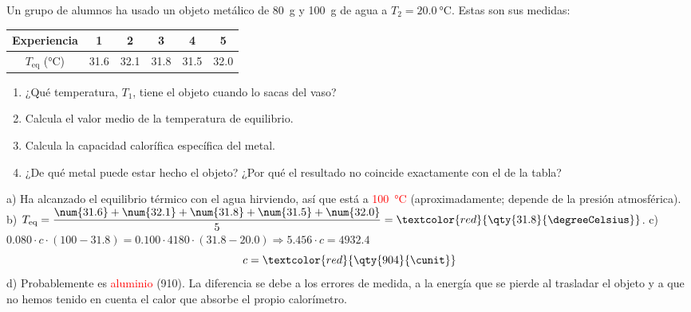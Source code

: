 \begin{exercise}
    Un grupo de alumnos ha usado un objeto metálico de \qty{80}{\gram} y \qty{100}{\gram} de agua a \(T_2 = \qty{20.0}{\degreeCelsius}\). Estas son sus medidas:
    \begin{center}
        \begin{tabular}{@{}cccccc@{}}
            \toprule
            \textbf{Experiencia} & \textbf{1} & \textbf{2} & \textbf{3} & \textbf{4} & \textbf{5} \\
            \midrule
            \(T_{\text{eq}}\) (\unit{\degreeCelsius}) & \num{31.6} & \num{32.1} & \num{31.8} & \num{31.5} & \num{32.0} \\
            \bottomrule
        \end{tabular}
    \end{center}
    \begin{enumerate}[label=\alph*)]
        \item ¿Qué temperatura, \(T_1\), tiene el objeto cuando lo sacas del vaso?
        \item Calcula el valor medio de la temperatura de equilibrio.
        \item Calcula la capacidad calorífica específica del metal.
        \item ¿De qué metal puede estar hecho el objeto? ¿Por qué el resultado no coincide exactamente con el de la tabla?
    \end{enumerate}
    \begin{solu}
        a) Ha alcanzado el equilibrio térmico con el agua hirviendo, así que está a \textcolor{red}{\qty{100}{\degreeCelsius}} (aproximadamente; depende de la presión atmosférica).
        b) \(T_{\text{eq}} = \dfrac{\num{31.6} + \num{32.1} + \num{31.8} + \num{31.5} + \num{32.0}}{5} = \textcolor{red}{\qty{31.8}{\degreeCelsius}}\).
        c) \(\num{0.080} \cdot c \cdot (100 - \num{31.8}) = \num{0.100} \cdot 4180 \cdot (\num{31.8} - \num{20.0}) \Rightarrow \num{5.456} \cdot c = \num{4932.4}\)
        \[ c = \textcolor{red}{\qty{904}{\cunit}} \]
        d) Probablemente es \textcolor{red}{aluminio} (\qty{910}{\cunit}). La diferencia se debe a los errores de medida, a la energía que se pierde al trasladar el objeto y a que no hemos tenido en cuenta el calor que absorbe el propio calorímetro.
    \end{solu}
\end{exercise}

